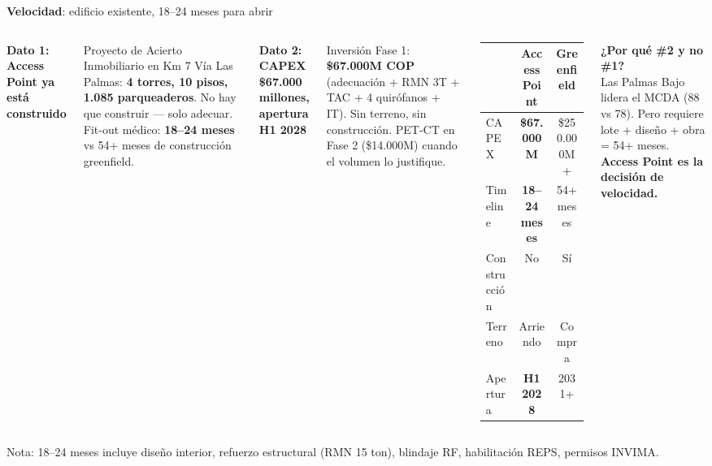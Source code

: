 \documentclass[aspectratio=169, 12pt]{beamer}
\newcommand{\eqvar}[2]{\textcolor{#1}{\textbf{#2}}}
\begin{document}
\begin{frame}{\eqvar{velocidad}{Velocidad}: edificio existente, 18--24 meses para abrir}

\begin{columns}[T]
\vspace{-2pt}

{\footnotesize\textbf{Dato 1: Access Point ya está construido}}

\vspace{4pt}
{\scriptsize
Proyecto de Acierto Inmobiliario en Km 7 Vía Las Palmas: \textbf{4 torres, 10 pisos, 1.085 parqueaderos}. No hay que construir --- solo adecuar. Fit-out médico: \textcolor{velocidad}{\textbf{18--24 meses}} vs 54+ meses de construcción greenfield.
}

\vspace{8pt}
{\footnotesize\textbf{Dato 2: CAPEX \$67.000 millones, apertura H1 2028}}

\vspace{4pt}
{\scriptsize
Inversión Fase 1: \textbf{\$67.000M COP} (adecuación + RMN 3T + TAC + 4 quirófanos + IT). Sin terreno, sin construcción. PET-CT en Fase 2 (\$14.000M) cuando el volumen lo justifique.
}

\vspace{4pt}
{\scriptsize
\begin{tabular}{@{}lcc@{}}
\toprule
& \textbf{Access Point} & \textbf{Greenfield} \\
\midrule
\rowcolor{velocidad!8}
CAPEX & \textcolor{velocidad}{\textbf{\$67.000M}} & \$250.000M+ \\
\rowcolor{velocidad!8}
Timeline & \textcolor{velocidad}{\textbf{18--24 meses}} & 54+ meses \\
Construcción & No & Sí \\
\rowcolor{velocidad!8}
Terreno & Arriendo & Compra \\
\rowcolor{velocidad!8}
Apertura & \textcolor{velocidad}{\textbf{H1 2028}} & 2031+ \\
\bottomrule
\end{tabular}
}

\vspace{6pt}
{\scriptsize
\textcolor{velocidad}{\textbf{¿Por qué \#2 y no \#1?}}\\[2pt]
Las Palmas Bajo lidera el MCDA (88 vs 78). Pero requiere lote + diseño + obra = 54+ meses. \textbf{Access Point es la decisión de velocidad.}
}
\end{columns}

\vspace{2pt}
{\tiny\textcolor{riesgo}{Nota: 18--24 meses incluye diseño interior, refuerzo estructural (RMN 15 ton), blindaje RF, habilitación REPS, permisos INVIMA.}}
\end{frame}
\end{document}
